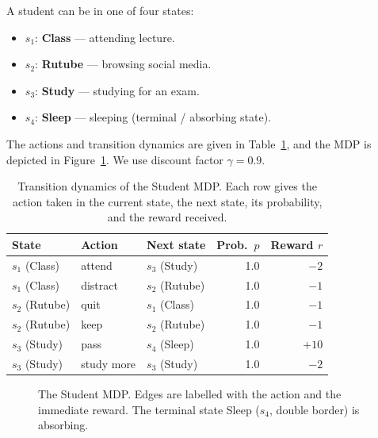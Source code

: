 \begin{example}
\label{ex:student-mdp}
A student can be in one of four states:
\begin{itemize}[leftmargin=*]
  \item $s_1$: \textbf{Class} --- attending lecture.
  \item $s_2$: \textbf{Rutube} --- browsing social media.
  \item $s_3$: \textbf{Study} --- studying for an exam.
  \item $s_4$: \textbf{Sleep} --- sleeping (terminal / absorbing state).
\end{itemize}
The actions and transition dynamics are given in Table~\ref{tab:student-mdp}, and the MDP is depicted in Figure~\ref{fig:student-mdp}. We use discount factor $\gamma = 0.9$.

\begin{table}[ht]
\centering
\caption{Transition dynamics of the Student MDP. Each row gives the action taken in the current state, the next state, its probability, and the reward received.}
\label{tab:student-mdp}
\begin{tabular}{lllrr}
\toprule
State & Action & Next state & Prob.\ $p$ & Reward $r$ \\
\midrule
$s_1$ (Class) & attend & $s_3$ (Study) & 1.0 & $-2$ \\
$s_1$ (Class) & distract & $s_2$ (Rutube) & 1.0 & $-1$ \\
$s_2$ (Rutube) & quit & $s_1$ (Class) & 1.0 & $-1$ \\
$s_2$ (Rutube) & keep & $s_2$ (Rutube) & 1.0 & $-1$ \\
$s_3$ (Study) & pass & $s_4$ (Sleep) & 1.0 & $+10$ \\
$s_3$ (Study) & study more & $s_3$ (Study) & 1.0 & $-2$ \\
\bottomrule
\end{tabular}
\end{table}

\begin{figure}[ht]
\centering
{}
\caption{The Student MDP. Edges are labelled with the action and the immediate reward. The terminal state Sleep ($s_4$, double border) is absorbing.}
\label{fig:student-mdp}
\end{figure}


\end{example}
